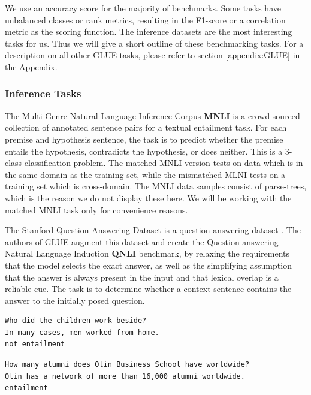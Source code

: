 \documentclass[a4paper,12pt,oneside,openright]{report}
\begin{document}
We use an accuracy score for the majority of benchmarks. 
Some tasks have unbalanced classes or rank metrics, resulting in the F1-score or a correlation metric as the scoring function. 
The inference datasets are the most interesting tasks for us. 
Thus we will give a short outline of these benchmarking tasks. 
For a description on all other GLUE tasks, please refer to section \ref{appendix:GLUE} in the Appendix.

\subsubsection{Inference Tasks}

The Multi-Genre Natural Language Inference Corpus \textbf{MNLI} \cite{N18-1101} \cite{bowman2015} is a crowd-sourced collection of annotated sentence pairs for a textual entailment task.
For each premise and hypothesis sentence, the task is to predict whether the premise entails the hypothesis, contradicts the hypothesis, or does neither.
This is a 3-class classification problem.
The matched MNLI version tests on data which is in the same domain as the training set, while the mismatched MLNI tests on a training set which is cross-domain.
The MNLI data samples consist of parse-trees, which is the reason we do not display these here.
We will be working with the matched MNLI task only for convenience reasons.

The Stanford Question Answering Dataset is a question-answering dataset \cite{rajpurkar2016}. 
The authors of GLUE augment this dataset and create the Question answering Natural Language Induction \textbf{QNLI} benchmark, by relaxing the requirements that the model selects the exact answer, as well as the simplifying assumption that the answer is always present in the input and that lexical overlap is a reliable cue.
The task is to determine whether a context sentence contains the answer to the initially posed question. 

\begin{tcolorbox}
\begin{verbatim}
Who did the children work beside?	
In many cases, men worked from home.
not_entailment
\end{verbatim}
\end{tcolorbox}

\begin{tcolorbox}
\begin{verbatim}
How many alumni does Olin Business School have worldwide?
Olin has a network of more than 16,000 alumni worldwide.
entailment
\end{verbatim}
\end{tcolorbox}
\end{document}
